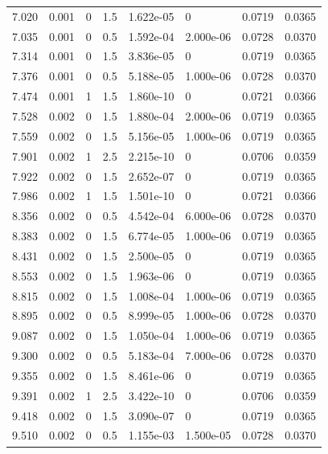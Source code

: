 \documentclass[preview]{standalone}
\begin{document}
{{{\begin{tabular}{L{1.2cm}C{1.2cm} C{0.3cm}C{0.5cm} C{1.4cm}C{1.4cm} C{1.4cm}C{1.4cm}}
  7.020  &  0.001  & 0     & 1.5 &  1.622e-05  & 0  & 0.0719 &  0.0365   \\ 
  7.035  &  0.001  & 0     & 0.5 &  1.592e-04  & 2.000e-06  & 0.0728 &  0.0370   \\ 
  7.314  &  0.001  & 0     & 1.5 &  3.836e-05  & 0  & 0.0719 &  0.0365   \\ 
  7.376  &  0.001  & 0     & 0.5 &  5.188e-05  & 1.000e-06  & 0.0728 &  0.0370   \\ 
  7.474  &  0.001  & 1     & 1.5 &  1.860e-10  & 0  & 0.0721 &  0.0366   \\ 
  7.528  &  0.002  & 0     & 1.5 &  1.880e-04  & 2.000e-06  & 0.0719 &  0.0365   \\ 
  7.559  &  0.002  & 0     & 1.5 &  5.156e-05  & 1.000e-06  & 0.0719 &  0.0365   \\ 
  7.901  &  0.002  & 1     & 2.5 &  2.215e-10  & 0  & 0.0706 &  0.0359   \\ 
  7.922  &  0.002  & 0     & 1.5 &  2.652e-07  & 0  & 0.0719 &  0.0365   \\ 
  7.986  &  0.002  & 1     & 1.5 &  1.501e-10  & 0  & 0.0721 &  0.0366   \\ 
  8.356  &  0.002  & 0     & 0.5 &  4.542e-04  & 6.000e-06  & 0.0728 &  0.0370   \\ 
  8.383  &  0.002  & 0     & 1.5 &  6.774e-05  & 1.000e-06  & 0.0719 &  0.0365   \\ 
  8.431  &  0.002  & 0     & 1.5 &  2.500e-05  & 0  & 0.0719 &  0.0365   \\ 
  8.553  &  0.002  & 0     & 1.5 &  1.963e-06  & 0  & 0.0719 &  0.0365   \\ 
  8.815  &  0.002  & 0     & 1.5 &  1.008e-04  & 1.000e-06  & 0.0719 &  0.0365   \\ 
  8.895  &  0.002  & 0     & 0.5 &  8.999e-05  & 1.000e-06  & 0.0728 &  0.0370   \\ 
  9.087  &  0.002  & 0     & 1.5 &  1.050e-04  & 1.000e-06  & 0.0719 &  0.0365   \\ 
  9.300  &  0.002  & 0     & 0.5 &  5.183e-04  & 7.000e-06  & 0.0728 &  0.0370   \\ 
  9.355  &  0.002  & 0     & 1.5 &  8.461e-06  & 0  & 0.0719 &  0.0365   \\ 
  9.391  &  0.002  & 1     & 2.5 &  3.422e-10  & 0  & 0.0706 &  0.0359   \\ 
  9.418  &  0.002  & 0     & 1.5 &  3.090e-07  & 0  & 0.0719 &  0.0365   \\ 
  9.510  &  0.002  & 0     & 0.5 &  1.155e-03  & 1.500e-05  & 0.0728 &  0.0370   \\ 

\end{tabular}}}}
\end{document}
